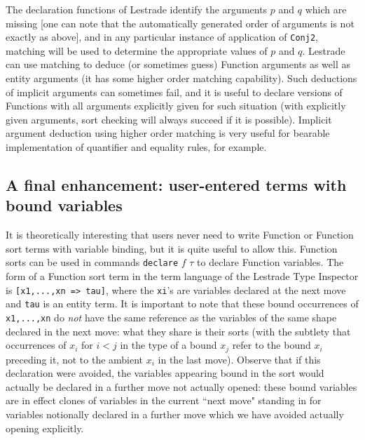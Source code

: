 \documentclass{article}
\begin{document}
The declaration functions of Lestrade identify the arguments $p$ and $q$ which are missing [one can note that the automatically generated order of arguments is not exactly as above], and in any particular instance of application of {\tt Conj2}, matching will be used to determine the appropriate values of $p$ and $q$.  Lestrade can use matching to deduce (or sometimes guess) Function arguments as well as entity arguments (it has some higher order matching capability).  Such deductions of implicit arguments can sometimes fail, and it is useful to declare versions of
Functions with all arguments explicitly given for such situation (with explicitly given arguments, sort checking will always succeed if it is possible).  Implicit argument deduction using higher order matching is very useful for bearable implementation of quantifier and equality rules, for example.

\subsection{A final enhancement:  user-entered terms with bound variables}

It is theoretically interesting that users never need to write Function or Function sort terms with variable binding, but it is quite useful to allow this.  Function sorts can be used in commands {\tt declare} $f$ $\tau$ to declare Function variables.  The form of a Function sort term in the term language of the Lestrade Type Inspector is {\tt [x1,...,xn => tau]}, where the {\tt xi}'s are variables declared at the next move and {\tt tau} is an entity term.  It is important to note that these bound occurrences of {\tt x1,...,xn} do {\em not\/} have the same reference as the variables of the same shape declared in the next move:  what they share is their sorts (with the subtlety that occurrences of $x_i$ for $i<j$ in the type of a bound $x_j$ refer to the bound $x_i$ preceding it, not to the ambient $x_i$ in the last move).  Observe that if this declaration were avoided, the variables appearing bound in the sort would actually be declared in a further move not actually opened:  these bound variables are in effect clones of variables in the current ``next move" standing in for variables notionally declared in a further move which we have avoided actually opening explicitly.
\end{document}
